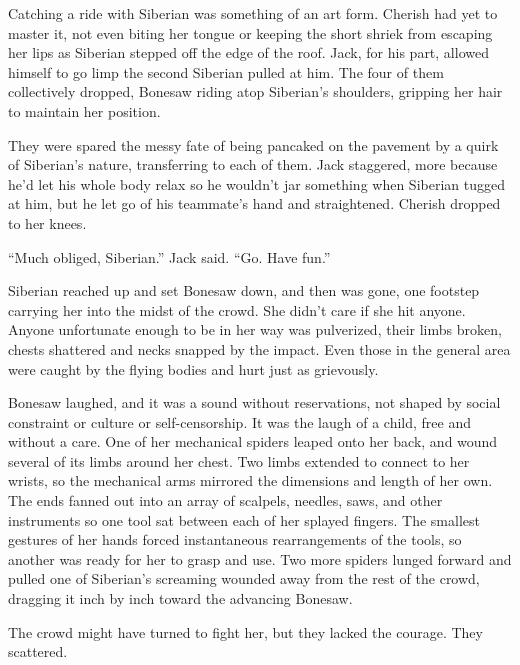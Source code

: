 Catching a ride with Siberian was something of an art form.  Cherish had yet to master it, not even biting her tongue or keeping the short shriek from escaping her lips as Siberian stepped off the edge of the roof.  Jack, for his part, allowed himself to go limp the second Siberian pulled at him.  The four of them collectively dropped, Bonesaw riding atop Siberian's shoulders, gripping her hair to maintain her position.



They were spared the messy fate of being pancaked on the pavement by a quirk of Siberian's nature, transferring to each of them.  Jack staggered, more because he'd let his whole body relax so he wouldn't jar something when Siberian tugged at him, but he let go of his teammate's hand and straightened.  Cherish dropped to her knees.



``Much obliged, Siberian.'' Jack said.  ``Go.  Have fun.''



Siberian reached up and set Bonesaw down, and then was gone, one footstep carrying her into the midst of the crowd.  She didn't care if she hit anyone.  Anyone unfortunate enough to be in her way was pulverized, their limbs broken, chests shattered and necks snapped by the impact.  Even those in the general area were caught by the flying bodies and hurt just as grievously.



Bonesaw laughed, and it was a sound without reservations, not shaped by social constraint or culture or self-censorship.  It was the laugh of a child, free and without a care.  One of her mechanical spiders leaped onto her back, and wound several of its limbs around her chest.  Two limbs extended to connect to her wrists, so the mechanical arms mirrored the dimensions and length of her own.  The ends fanned out into an array of scalpels, needles, saws, and other instruments so one tool sat between each of her splayed fingers.  The smallest gestures of her hands forced instantaneous rearrangements of the tools, so another was ready for her to grasp and use.  Two more spiders lunged forward and pulled one of Siberian's screaming wounded away from the rest of the crowd, dragging it inch by inch toward the advancing Bonesaw.



The crowd might have turned to fight her, but they lacked the courage.  They scattered.



